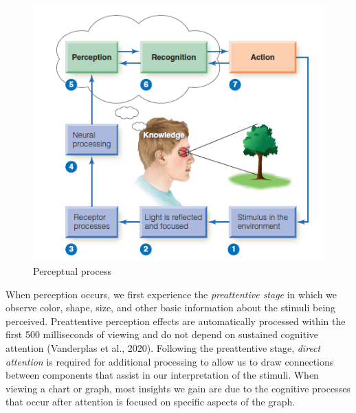 \documentclass[print]{nuthesis}
\begin{document}
\begin{figure}[tbp]

{\centering \includegraphics[width=0.75\linewidth,]{images/perceptual-process-goldsein-pg5} 

}

\caption{Perceptual process}\label{fig:perceptual-process}
\end{figure}

When perception occurs, we first experience the \emph{preattentive stage} in which we observe color, shape, size, and other basic information about the stimuli being perceived. Preattentive perception effects are automatically processed within the first 500 milliseconds of viewing and do not depend on sustained cognitive attention (Vanderplas et al., 2020).
Following the preattentive stage, \emph{direct attention} is required for additional processing to allow us to draw connections between components that assist in our interpretation of the stimuli.
When viewing a chart or graph, most insights we gain are due to the cognitive processes that occur after attention is focused on specific aspects of the graph.
\end{document}
